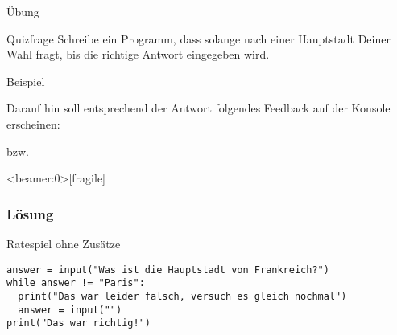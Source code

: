 \begin{fragile}{Übung}
\begin{block}{Quizfrage}
\vspace{2pt}
Schreibe ein Programm, dass solange nach einer Hauptstadt Deiner Wahl fragt, bis die richtige Antwort eingegeben wird. 
\end{block}

\pause 
\vspace{12pt}

\begin{exampleblock}{Beispiel}
\vspace{2pt}



Darauf hin soll entsprechend der Antwort folgendes Feedback auf der Konsole erscheinen: 


bzw. 

\end{exampleblock}
	
\end{fragile}


\begin{frame}<beamer:0>[fragile]
\frametitle{Lösung}
\begin{solutionblock}{Ratespiel ohne Zusätze}
\begin{verbatim}
answer = input("Was ist die Hauptstadt von Frankreich?")
while answer != "Paris": 
  print("Das war leider falsch, versuch es gleich nochmal")
  answer = input("")
print("Das war richtig!")
\end{verbatim}
\end{solutionblock}
\end{frame}


%
%
%
%	
%

